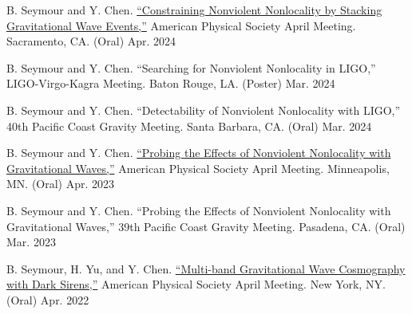 

\begin{cvpresentations}


    \cvpresentation
    {B. Seymour and Y. Chen. \href{https://meetings.aps.org/Meeting/APR23/Session/C08.9}{“Constraining Nonviolent Nonlocality by Stacking Gravitational Wave Events,”} American Physical Society April Meeting. Sacramento, CA. (Oral)}
    {Apr. 2024}
    

    \cvpresentation
    {B. Seymour and Y. Chen. “Searching for Nonviolent Nonlocality in LIGO,” LIGO-Virgo-Kagra Meeting. Baton Rouge, LA. (Poster)}
    {Mar. 2024}
    

    \cvpresentation
    {B. Seymour and Y. Chen. “Detectability of Nonviolent Nonlocality with LIGO,” 40th Pacific Coast Gravity Meeting. Santa Barbara, CA. (Oral)}
    {Mar. 2024}


    \cvpresentation
    {B. Seymour and Y. Chen. \href{https://meetings.aps.org/Meeting/APR23/Session/C08.9}{“Probing the Effects of Nonviolent Nonlocality with Gravitational Waves,”} American Physical Society April Meeting. Minneapolis, MN. (Oral)}
    {Apr. 2023}
    

    \cvpresentation
    {B. Seymour and Y. Chen. “Probing the Effects of Nonviolent Nonlocality with Gravitational Waves,” 39th Pacific Coast Gravity Meeting. Pasadena, CA. (Oral)}
    {Mar. 2023}


    \cvpresentation
    {B. Seymour, H. Yu, and Y. Chen. \href{https://meetings.aps.org/Meeting/APR22/Session/Q16.7}{“Multi-band Gravitational Wave Cosmography with Dark Sirens,”} American Physical Society April Meeting. New York, NY. (Oral)}
    {Apr. 2022}
    

\end{cvpresentations}
